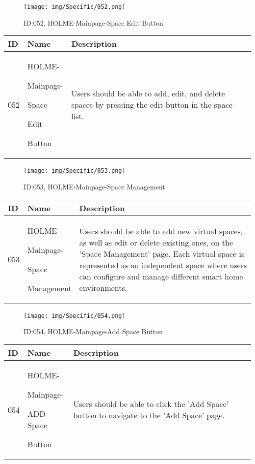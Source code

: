 \documentclass[conference]{IEEEtran}
\begin{document}
\begin{enumerate}
\begin{figure}[h]
\centering
\texttt{[image: img/Specific/052.png]}
\caption{ID:052, HOLME-Mainpage-Space Edit Button}
\end{figure}
\begin{table}[h]
\def\arraystretch{1.2} \small
    \begin{tabular}{|p{1cm}|p{1.8cm}|p{5.0cm}|}
        \hline
        ID & Name & Description\\ \hline
         052 \par  & HOLME-\par Mainpage-\par Space \par Edit \par Button &Users should be able to add, edit, and delete spaces by pressing the edit button in the space list.\\ \hline
    \end{tabular}
\end{table}

\begin{figure}[h]
\centering
\texttt{[image: img/Specific/053.png]}
\caption{ID:053, HOLME-Mainpage-Space Management}
\end{figure}
\begin{table}[h]
\def\arraystretch{1.2} \small
    \begin{tabular}{|p{1cm}|p{1.8cm}|p{5.0cm}|}
        \hline
        ID & Name & Description\\ \hline
         053 \par  & HOLME-\par Mainpage-\par Space \par Management &Users should be able to add new virtual spaces, as well as edit or delete existing ones, on the 'Space Management' page. Each virtual space is represented as an independent space where users can configure and manage different smart home environments.\\ \hline
    \end{tabular}
\end{table}
\clearpage

\begin{figure}[h]
\centering
\texttt{[image: img/Specific/054.png]}
\caption{ID:054, HOLME-Mainpage-Add Space Button }
\end{figure}
\begin{table}[h]
\def\arraystretch{1.2} \small
    \begin{tabular}{|p{1cm}|p{1.8cm}|p{5.0cm}|}
        \hline
        ID & Name & Description\\ \hline
         054 \par  & HOLME-\par Mainpage-\par ADD Space \par Button &Users should be able to click the 'Add Space' button to navigate to the 'Add Space' page.\\ \hline
    \end{tabular}
\end{table}


\end{enumerate}
\end{document}
